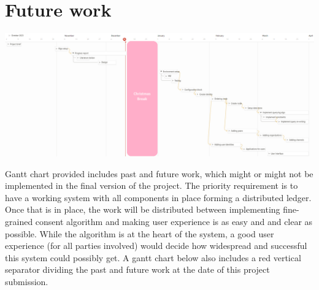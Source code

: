 \documentclass[12pt]{article}
\begin{document}
    \section{Future work}

    \vspace{1cm}
    \includegraphics[width=\textwidth]{gantt.png}
    \vspace{1cm}

    Gantt chart provided includes past and future work, which might or might not be implemented in the final version of the project. The priority requirement is to have a working system with all components in place forming a distributed ledger. Once that is in place, the work will be distributed between implementing fine-grained consent algorithm and making user experience is as easy and and clear as possible. While the algorithm is at the heart of the system, a good user experience (for all parties involved) would decide how widespread and successful this system could possibly get. A gantt chart below also includes a red vertical separator dividing the past and future work at the date of this project submission.

    




    
    
    \newpage
    
    
\end{document}
